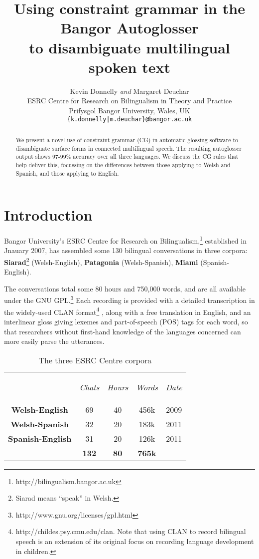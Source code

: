 \documentclass[11pt]{article}
\title{Using constraint grammar in the Bangor Autoglosser\\ to disambiguate multilingual spoken text}
\author{Kevin Donnelly \textit{and} Margaret Deuchar\\
  ESRC Centre for Research on Bilingualism in Theory and Practice\\
  Prifysgol Bangor University, Wales, UK\\
  {\tt \{k.donnelly|m.deuchar\}@bangor.ac.uk}  }
\date{}
\begin{document}
\maketitle
\begin{abstract}
We present a novel use of constraint grammar (CG) in automatic glossing software to disambiguate surface forms in connected multilingual speech.  The resulting autoglosser output shows 97-99\% accuracy over all three languages.  We discuss the CG rules that help deliver this, focussing on the differences between those applying to Welsh and Spanish, and those applying to English.
\end{abstract}

\smallskip
\section{Introduction}
\label{sec:intro}

Bangor University's ESRC Centre for Research on Bilingualism,\footnote{http://bilingualism.bangor.ac.uk} established in Jnauary 2007, has assembled some 130 bilingual conversations in three corpora: \textbf{Siarad}\footnote{Siarad means ``speak'' in Welsh.} (Welsh-English), \textbf{Patagonia} (Welsh-Spanish), \textbf{Miami} (Spanish-English).

The conversations total some 80 hours and 750,000 words, and are all available under the GNU GPL.\footnote{http://www.gnu.org/licenses/gpl.html}  Each recording is provided with a detailed transcription in the widely-used CLAN format\footnote{http://childes.psy.cmu.edu/clan.  Note that using CLAN to record bilingual speech is an extension of its original focus on recording language development in children.} \cite{macwhinney2000}, along with a free translation in English, and an interlinear gloss giving lexemes and part-of-speech (POS) tags for each word, so that researchers without first-hand knowledge of the languages concerned can more easily parse the utterances.

\begin{table}[!hbtp]
\centering
\begin{tabular}{ccccc}
& \begin{small}\textit{Chats}\end{small} & \begin{small}\textit{Hours}\end{small} & \begin{small}\textit{Words}\end{small} & \begin{small}\textit{Date}\end{small} \\
\cline{1-5}\noalign{\smallskip}
\textbf{Welsh-English} & 69 & 40 & 456k & 2009 \\
\textbf{Welsh-Spanish} & 32 & 20 & 183k & 2011 \\
\textbf{Spanish-English} & 31 & 20 & 126k & 2011 \\
\hline\noalign{\smallskip}
& \textbf{132} & \textbf{80} & \textbf{765k} \\
\end{tabular}
\caption{The three ESRC Centre corpora}
\label{corpora}
\end{table}
\end{document}
